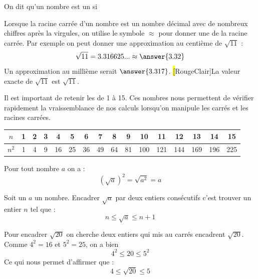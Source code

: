 \begin{definitionbox}
    On dit qu'un nombre est un  si 
\end{definitionbox}

\begin{remarquebox}
    Lorsque la racine carrée d'un nombre est un nombre décimal avec de nombreux
    chiffres après la virgules, on utilise le symbole $\approx$ pour donner une
     de la racine carrée.
    \newline
    \newline
    Par exemple on peut donner une approximation au centième de $\sqrt{11}$ :
    $$\sqrt{11} = 3.316625... \approx \answer{3.32} $$
    Un approximation au millième serait $\answer{3.317}$. \hl[RougeClair]{La
    valeur exacte de $\sqrt{11}$ est $\sqrt{11}$}.
\end{remarquebox}

\begin{aretenir}
    Il est important de retenir les  de 1 à 15. Ces nombres
    nous permettent de vérifier rapidement la vraissemblance de nos calculs
    lorsqu'on manipule les carrés et les racines carrées.
    \begin{center}
        \begin{tabular}{|c||c|c|c|c|c|c|c|c|c|c|c|c|c|c|c|}
        \hline
            $n$ & 1 & 2 & 3 & 4  & 5  & 6  & 7  & 8  & 9  & 10  & 11  & 12  & 13  & 14  & 15  \\ \hline
            $n^2$ & 1 & 4 & 9 & 16 & 25 & 36 & 49 & 64 & 81 & 100 & 121 & 144 & 169 & 196 & 225 \\ \hline
        \end{tabular}
    \end{center}
\end{aretenir}

\begin{propbox}
    Pour tout nombre $a$  on a : 
    $$(\sqrt{a})^2=\sqrt{a^2}=a$$
\end{propbox}

\begin{methodebox}
    Soit un $a$ un nombre. Encadrer $\sqrt{a}$ par deux entiers consécutifs
    c'est trouver un entier $n$ tel que : 
    $$n\le \sqrt{a}\le n+1 $$
\end{methodebox}

\begin{exemplebox}
    Pour encadrer $\sqrt{20}$ on cherche deux entiers qui mis au
    carrés encadrent $\sqrt{20}$. Comme $4^2 = 16$ et $5^2=25$, on a bien
    $$4^2 \le 20 \le 5^2$$
    Ce qui nous permet d'affirmer que :
    $$4 \le \sqrt{20} \le 5$$
\end{exemplebox}


